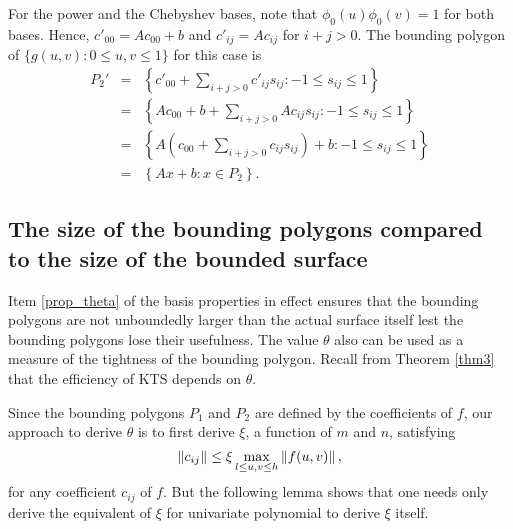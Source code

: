 \documentclass[12pt]{article}
\begin{document}
For the power and the Chebyshev bases, note that $\phi_0(u)\phi_0(v) = 1$
for both bases.  Hence, $c'_{00} = Ac_{00}+b$ and $c'_{ij} = Ac_{ij}$ for
$i+j > 0$.  The bounding polygon of $\{g(u,v): 0 \leq u,v \leq 1 \}$ for this case is
\begin{eqnarray}
P_2' & = & \left\{ c'_{00} + \sum_{i+j > 0} c'_{ij} s_{ij} : -1
\leq s_{ij} \leq 1 \right\} \nonumber \\
& = & \left\{ Ac_{00}+b + \sum_{i+j > 0} Ac_{ij} s_{ij} : -1
\leq s_{ij} \leq 1 \right\} \nonumber \\
& = & \left\{ A\left( c_{00} + \sum_{i+j > 0} c_{ij} s_{ij} \right) + b: -1
\leq s_{ij} \leq 1 \right\} \nonumber \\
& = & \left\{ Ax + b : x \in P_2 \right\}. \nonumber
\end{eqnarray}


\subsection{The size of the bounding polygons compared to the size of the bounded surface}

Item \ref{prop_theta} of the basis properties in effect ensures that the bounding polygons
are not unboundedly larger than the actual surface itself lest the bounding polygons
lose their usefulness.  The value $\theta$ also can be used as a measure of the
tightness of the bounding polygon.  Recall from Theorem \ref{thm3} that the
efficiency of KTS depends on $\theta$.

Since the bounding polygons $P_1$ and $P_2$ are defined by the coefficients of $f$,
our approach to derive $\theta$ is to first derive $\xi$, a function of $m$ and $n$, satisfying
\[
\left\|c_{ij}\right\| \leq \xi \max_{l \leq u,v \leq h} \left\|f(u,v)\right\|,
\]
for any coefficient $c_{ij}$ of $f$.
But the following lemma shows that one needs only derive
the equivalent of $\xi$ for univariate polynomial to derive $\xi$ itself.
\end{document}
